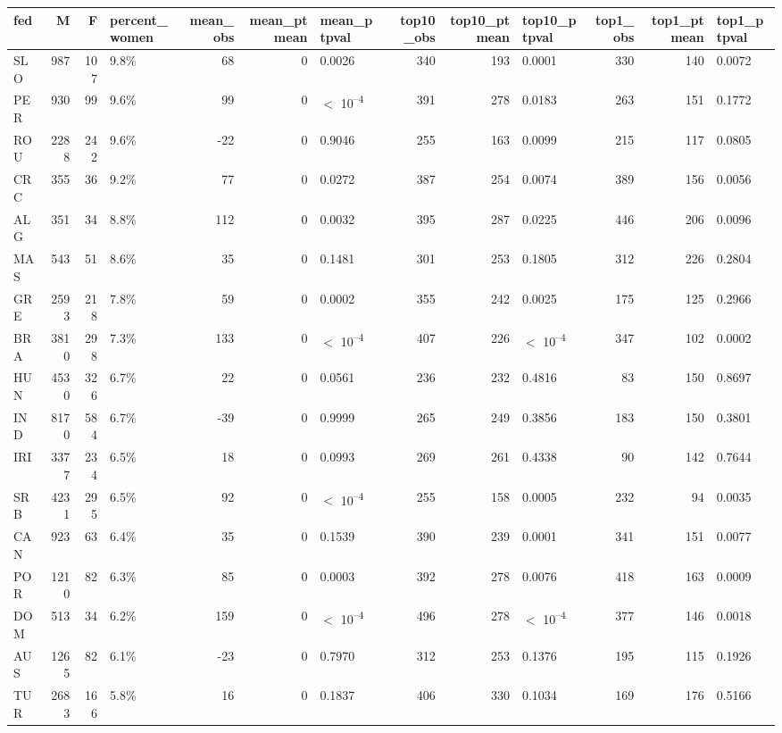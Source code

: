 
\begin{tabular}{l|r|r|l|r|r|l|r|r|l|r|r|l}
\hline
fed & M & F & percent_women & mean_obs & mean_ptmean & mean_ptpval & top10_obs & top10_ptmean & top10_ptpval & top1_obs & top1_ptmean & top1_ptpval\\
\hline
SLO & 987 & 107 & 9.8\% & 68 & 0 & 0.0026 & 340 & 193 & 0.0001 & 330 & 140 & 0.0072\\
\hline
PER & 930 & 99 & 9.6\% & 99 & 0 & $<$ 10\textsuperscript{--4} & 391 & 278 & 0.0183 & 263 & 151 & 0.1772\\
\hline
ROU & 2288 & 242 & 9.6\% & -22 & 0 & 0.9046 & 255 & 163 & 0.0099 & 215 & 117 & 0.0805\\
\hline
CRC & 355 & 36 & 9.2\% & 77 & 0 & 0.0272 & 387 & 254 & 0.0074 & 389 & 156 & 0.0056\\
\hline
ALG & 351 & 34 & 8.8\% & 112 & 0 & 0.0032 & 395 & 287 & 0.0225 & 446 & 206 & 0.0096\\
\hline
MAS & 543 & 51 & 8.6\% & 35 & 0 & 0.1481 & 301 & 253 & 0.1805 & 312 & 226 & 0.2804\\
\hline
GRE & 2593 & 218 & 7.8\% & 59 & 0 & 0.0002 & 355 & 242 & 0.0025 & 175 & 125 & 0.2966\\
\hline
BRA & 3810 & 298 & 7.3\% & 133 & 0 & $<$ 10\textsuperscript{--4} & 407 & 226 & $<$ 10\textsuperscript{--4} & 347 & 102 & 0.0002\\
\hline
HUN & 4530 & 326 & 6.7\% & 22 & 0 & 0.0561 & 236 & 232 & 0.4816 & 83 & 150 & 0.8697\\
\hline
IND & 8170 & 584 & 6.7\% & -39 & 0 & 0.9999 & 265 & 249 & 0.3856 & 183 & 150 & 0.3801\\
\hline
IRI & 3377 & 234 & 6.5\% & 18 & 0 & 0.0993 & 269 & 261 & 0.4338 & 90 & 142 & 0.7644\\
\hline
SRB & 4231 & 295 & 6.5\% & 92 & 0 & $<$ 10\textsuperscript{--4} & 255 & 158 & 0.0005 & 232 & 94 & 0.0035\\
\hline
CAN & 923 & 63 & 6.4\% & 35 & 0 & 0.1539 & 390 & 239 & 0.0001 & 341 & 151 & 0.0077\\
\hline
POR & 1210 & 82 & 6.3\% & 85 & 0 & 0.0003 & 392 & 278 & 0.0076 & 418 & 163 & 0.0009\\
\hline
DOM & 513 & 34 & 6.2\% & 159 & 0 & $<$ 10\textsuperscript{--4} & 496 & 278 & $<$ 10\textsuperscript{--4} & 377 & 146 & 0.0018\\
\hline
AUS & 1265 & 82 & 6.1\% & -23 & 0 & 0.7970 & 312 & 253 & 0.1376 & 195 & 115 & 0.1926\\
\hline
TUR & 2683 & 166 & 5.8\% & 16 & 0 & 0.1837 & 406 & 330 & 0.1034 & 169 & 176 & 0.5166\\

\end{tabular}
